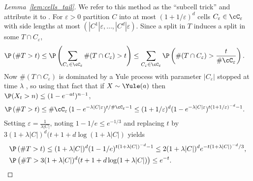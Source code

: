 \documentclass{article}
\begin{document}
\begin{proof}[Lemma~\ref{lem:cells_tail}]

  We refer to this method as the ``subcell trick''
  and attribute it to \cite{mourtada2017universal}.
  For $\varepsilon > 0$ partition $C$ into
  at most $(1 + 1/\varepsilon)^d$ cells $C_\varepsilon \in \cC_\varepsilon$
  with side lengths at most $(|C^1| \varepsilon, \ldots, |C^d| \varepsilon)$.
  Since a split in $T$ induces a split in some
  $T \cap C_\varepsilon$,
  \begin{align*}
    \P\left(\# T > t \right)
    &\leq
      \P\left(\sum_{C_\varepsilon \in \cC_\varepsilon}
      \# (T \cap C_\varepsilon) > t \right)
      \leq
      \sum_{C_\varepsilon \in \cC_\varepsilon}
      \P\left(
      \# (T \cap C_\varepsilon) >
      \frac{t}{\# \cC_\varepsilon}
      \right).
  \end{align*}
  Now $\# (T \cap C_\varepsilon)$ is dominated by a Yule process
  with parameter $|C_\varepsilon|$ stopped at time $\lambda$
  \cite[proof of Lemma~2]{mourtada2017universal},
  so using that fact that if
  $X \sim \Yule(a)$
  then $\P(X_t > n) \leq (1-e^{-at})^{n-1}$,
  \begin{align*}
    \P\left(\# T > t \right)
    &\leq
      \# \cC_\varepsilon \,
      (1 - e^{-\lambda |C| \varepsilon})^{t / \# \cC_\varepsilon - 1}
      \leq
      (1 + 1/\varepsilon)^d
      (1 - e^{-\lambda |C| \varepsilon})^{t (1 + 1/\varepsilon)^{-d} - 1}.
  \end{align*}
  Setting $\varepsilon = \frac{1}{\lambda |C|}$,
  noting $1-1/e \leq e^{-1/3}$
  and replacing $t$ by
  $3 (1 + \lambda |C|)^d
  (t + 1 + d \log(1 + \lambda |C|)$
  yields
  \begin{align*}
    &\P\left(\# T > t \right)
      \leq
      (1 + \lambda |C|)^d
      (1 - 1/e)^{t (1 + \lambda |C|)^{-d} - 1}
      \leq
      2 (1 + \lambda |C|)^d
      e^{-t (1 + \lambda |C|)^{-d} / 3}, \\
    &\P\left(\# T >
      3
      (1 + \lambda |C|)^d
      (t + 1 + d \log(1 + \lambda |C|)
      \right)
      \leq
      e^{-t}.
  \end{align*}
\end{proof}
\end{document}
